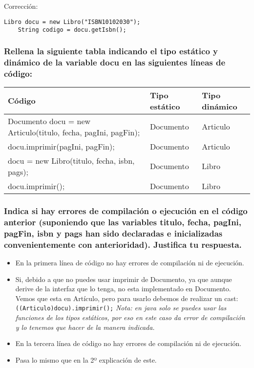 \documentclass[a4paper,12pt]{article}
\begin{document}
Corrección:
\begin{lstlisting}[style=customjava, caption={Corrección del código}]
    Libro docu = new Libro("ISBN10102030");
    String codigo = docu.getIsbn();
\end{lstlisting}

\subsubsection*{Rellena la siguiente tabla indicando el tipo estático y dinámico de la variable docu en las siguientes líneas de código:
}    
    \begin{table}[H]
        \centering
        \begin{tabular}{|p{6cm}|l|l|}
            \hline
            \textbf{Código} & \textbf{Tipo estático} & \textbf{Tipo dinámico} \\ \hline
            Documento docu = new Articulo(titulo, fecha, pagIni, pagFin); & Documento & Articulo \\ \hline
            docu.imprimir(pagIni, pagFin); & Documento & Articulo \\ \hline
            docu = new Libro(titulo, fecha, isbn, pags); & Documento & Libro \\ \hline
            docu.imprimir(); & Documento & Libro \\ \hline
        \end{tabular}
    \end{table}


\subsubsection*{Indica si hay errores de compilación o ejecución en el código anterior (suponiendo que las variables titulo, fecha, pagIni, pagFin, isbn y pags han sido declaradas e inicializadas convenientemente con anterioridad). Justifica tu respuesta.}

\begin{itemize}
    \item En la primera línea de código no hay errores de compilación ni de ejecución.
    \item Si, debido a que no puedes usar imprimir de Documento, ya que aunque derive de la interfaz que lo tenga, no esta implementado en Documento. Vemos que esta en Artículo, pero para usarlo debemos de realizar un cast: \texttt{((Articulo)docu).imprimir();} \textit{Nota: en java solo se puedes usar las funciones de los tipos estáticos, por eso en este caso da error de compilación y lo tenemos que hacer de la manera indicada.}
    \item En la tercera línea de código no hay errores de compilación ni de ejecución.
    \item Pasa lo mismo que en la 2º explicación de este.
\end{itemize}
\end{document}
